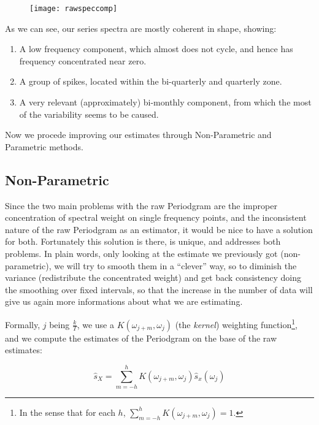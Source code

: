 \documentclass[12pt]{article} %
\begin{document}
\begin{figure}[H]
\begin{center}
\texttt{[image: rawspeccomp]}
\caption{}
\end{center}
\end{figure}

As we can see, our series spectra are mostly coherent in shape, showing:

\begin{enumerate}
\item A low frequency component, which almost does not cycle, and hence has frequency concentrated near zero.
\item A group of spikes, located within the bi-quarterly and quarterly zone.
\item A very relevant (approximately) bi-monthly component, from which the most of the variability seems to be caused.
\end{enumerate}

Now we procede improving our estimates through Non-Parametric and Parametric methods.

\subsection{Non-Parametric}

Since the two main problems with the raw Periodgram are the improper concentration of spectral weight on single frequency points, and the inconsistent nature of the raw Periodgram as an estimator, it would be nice to have a solution for both. Fortunately this solution is there, is unique, and addresses both problems. In plain words, only looking at the estimate we previously got (non-parametric), we will try to smooth them in a ``clever'' way, so to diminish the variance (redistribute the concentrated weight) and get back consistency doing the smoothing over fixed intervals, so that the increase in the number of data will give us again more informations about what we are estimating.

Formally, $j$ being $\frac{k}{T}$, we use a $K(\omega_{j+m},\omega_j)$ (the {\em kernel}) weighting function\footnote{
In the sense that for each $h$, $\sum_{m=-h}^{h}K(\omega_{j+m},\omega_j)=1$.}, and we compute the estimates of the Periodgram on the base of the raw estimates:

\begin{equation}
\hat{s}_X=\sum\limits_{m=-h}^{h} K(\omega_{j+m},\omega_j)\hat{s}_x(\omega_j)
\end{equation}
\end{document}
